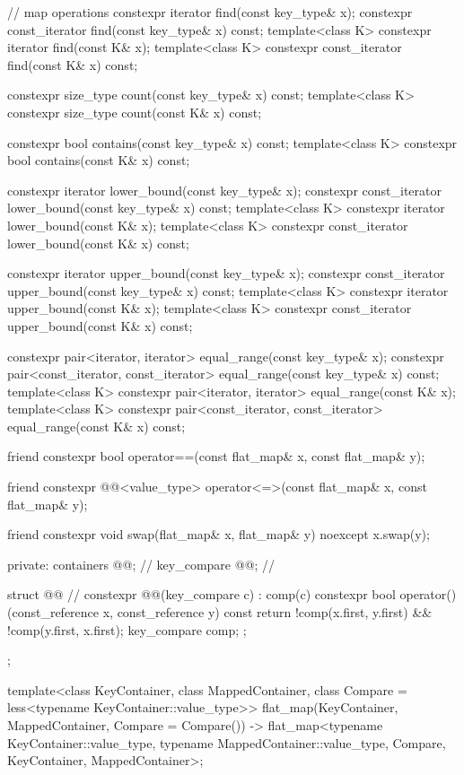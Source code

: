 \begin{codeblock}
{{    // map operations
    constexpr iterator find(const key_type& x);
    constexpr const_iterator find(const key_type& x) const;
    template<class K> constexpr iterator find(const K& x);
    template<class K> constexpr const_iterator find(const K& x) const;

    constexpr size_type count(const key_type& x) const;
    template<class K> constexpr size_type count(const K& x) const;

    constexpr bool contains(const key_type& x) const;
    template<class K> constexpr bool contains(const K& x) const;

    constexpr iterator lower_bound(const key_type& x);
    constexpr const_iterator lower_bound(const key_type& x) const;
    template<class K> constexpr iterator lower_bound(const K& x);
    template<class K> constexpr const_iterator lower_bound(const K& x) const;

    constexpr iterator upper_bound(const key_type& x);
    constexpr const_iterator upper_bound(const key_type& x) const;
    template<class K> constexpr iterator upper_bound(const K& x);
    template<class K> constexpr const_iterator upper_bound(const K& x) const;

    constexpr pair<iterator, iterator> equal_range(const key_type& x);
    constexpr pair<const_iterator, const_iterator> equal_range(const key_type& x) const;
    template<class K> constexpr pair<iterator, iterator> equal_range(const K& x);
    template<class K>
      constexpr pair<const_iterator, const_iterator> equal_range(const K& x) const;

    friend constexpr bool operator==(const flat_map& x, const flat_map& y);

    friend constexpr @@<value_type>
      operator<=>(const flat_map& x, const flat_map& y);

    friend constexpr void swap(flat_map& x, flat_map& y) noexcept
      { x.swap(y); }

  private:
    containers @@;               // \expos
    key_compare @@;        // \expos

    struct @@ {  // \expos
      constexpr @@(key_compare c) : comp(c) { }
      constexpr bool operator()(const_reference x, const_reference y) const {
        return !comp(x.first, y.first) && !comp(y.first, x.first);
      }
      key_compare comp;
    };
  };

  template<class KeyContainer, class MappedContainer,
           class Compare = less<typename KeyContainer::value_type>>
    flat_map(KeyContainer, MappedContainer, Compare = Compare())
      -> flat_map<typename KeyContainer::value_type, typename MappedContainer::value_type,
                  Compare, KeyContainer, MappedContainer>;

}
\end{codeblock}
